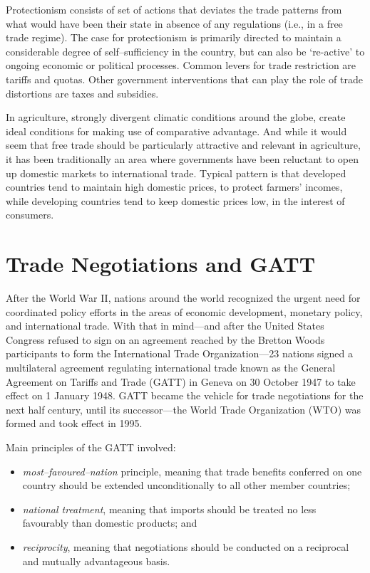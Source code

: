 \documentclass[
  oneside]{book}
\providecommand{\tightlist}{%
  \setlength{\itemsep}{0pt}\setlength{\parskip}{0pt}}
\begin{document}
Protectionism consists of set of actions that deviates the trade patterns from what would have been their state in absence of any regulations (i.e., in a free trade regime). The case for protectionism is primarily directed to maintain a considerable degree of self--sufficiency in the country, but can also be `re-active' to ongoing economic or political processes. Common levers for trade restriction are tariffs and quotas. Other government interventions that can play the role of trade distortions are taxes and subsidies.

In agriculture, strongly divergent climatic conditions around the globe, create ideal conditions for making use of comparative advantage. And while it would seem that free trade should be particularly attractive and relevant in agriculture, it has been traditionally an area where governments have been reluctant to open up domestic markets to international trade. Typical pattern is that developed countries tend to maintain high domestic prices, to protect farmers' incomes, while developing countries tend to keep domestic prices low, in the interest of consumers.

\hypertarget{trade-negotiations-and-gatt}{%
\section{Trade Negotiations and GATT}\label{trade-negotiations-and-gatt}}

After the World War II, nations around the world recognized the urgent need for coordinated policy efforts in the areas of economic development, monetary policy, and international trade. With that in mind---and after the United States Congress refused to sign on an agreement reached by the Bretton Woods participants to form the International Trade Organization---23 nations signed a multilateral agreement regulating international trade known as the General Agreement on Tariffs and Trade (GATT) in Geneva on 30 October 1947 to take effect on 1 January 1948. GATT became the vehicle for trade negotiations for the next half century, until its successor---the World Trade Organization (WTO) was formed and took effect in 1995.

Main principles of the GATT involved:

\begin{itemize}
\tightlist
\item
  \emph{most--favoured--nation} principle, meaning that trade benefits conferred on one country should be extended unconditionally to all other member countries;
\item
  \emph{national treatment}, meaning that imports should be treated no less favourably than domestic products; and
\item
  \emph{reciprocity}, meaning that negotiations should be conducted on a reciprocal and mutually advantageous basis.
\end{itemize}
\end{document}
